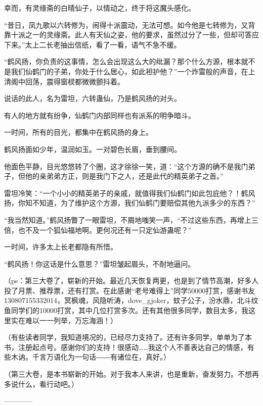 \begin{this_body}
幸而，有灵缘斋的白晴仙子，以情动之，终于将这魔头感化。

“昔日，凤九歌以六转修为，闹得十派震动，无法可想。如今他是七转修为，又背靠十派之一的灵缘斋。此人有天仙之姿，他的要求，虽然过分了一些，但却可答应下来。”太上二长老抽出信纸，看了一看，语气不急不缓。

“鹤风扬，你负责的这事情，怎么会出现这么大的纰漏？那个什么方源，根本就不是我们仙鹤门的子弟，你处于什么居心，如此袒护他？”一个炸雷般的声音，在上清阁中回荡，震得窗棂都微微颤抖着。

说话的此人，名为雷坦，六转蛊仙，乃是鹤风扬的对头。

有人的地方就有纷争，仙鹤门内部同样也有派系的明争暗斗。

一时间，所有的目光，都集中在鹤风扬的身上。

鹤风扬面如少年，温润如玉。一对碧色长眉，垂到腰间。

他面色平静，目光悠悠转了个圈，这才徐徐一笑，道：“这个方源的确不是我门弟子，但他的亲弟弟方正，则是我门下之人，还是此代的精英弟子之首。”

雷坦冷笑：“一个小小的精英弟子的亲戚，就值得我们仙鹤门如此包庇他？！鹤风扬，你知不知道，为了维护这个方源，我们仙鹤门要赔偿其他九派多少的东西？”

“我当然知道。”鹤风扬瞥了一眼雷坦，不屑地嗤笑一声，“不过这些东西，再增上三倍，也不及一个狐仙福地啊。更何况还有一只定仙游蛊呢？”

一时间，许多太上长老都隐有所悟。

“鹤风扬！你这话是什么意思？”雷坦皱起眉头，不耐地逼问。

（ps：第三大卷了，崭新的开始。最近几天恢复两更，也是到了情节高潮，好多人投了月票、推荐票，还有打赏。在此感谢“老号难得上”同学50000打赏，感谢书友130807155332014，冥枫魂，风隐听涛，dove\_gjoker，蚊子公子，汾水鼎，北斗纹鱼同学们的10000打赏，其中几位打赏多次。还有其他很多同学，数目太多，我这里实在难以一一列举，万忘海涵！）

（有些读者同学，我知道境况的，已经尽力支持了。还有许多同学，单单为了本书，注册起点号。感谢你们的支持！很感动……我这个人不善表达自己的情感，有些木讷。千言万语化为一句话――有诸位在，真好。）

（第三大卷，是本书崭新的开始。对于我本人来讲，也是重新，奋发努力。不想再多说什么，看行动吧。）

------------

\end{this_body}


